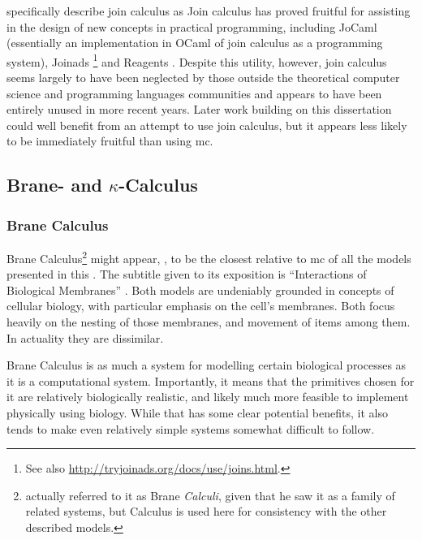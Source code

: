 \citeauthor{Fournet2002} specifically describe join calculus as   Join calculus has proved fruitful for assisting in the design of new concepts in practical programming, including JoCaml \cite{Fournet2003} (essentially an implementation in OCaml of join calculus as a programming system), Joinads \cite{Petricek2011}\footnote{See also \url{http://tryjoinads.org/docs/use/joins.html}.} and Reagents \cite{Turon2012}.  Despite this utility, however, join calculus seems largely to have been neglected by those outside the theoretical computer science and programming languages communities and appears to have been entirely unused in more recent years.  Later work building on this dissertation could well benefit from an attempt to use join calculus, but it appears less likely to be immediately fruitful than using \gls{mc}.

\subsection[Brane and Kappa-Calculus]{Brane- and \(\kappa\)-Calculus}
\subsubsection{Brane Calculus}
Brane Calculus\footnote{\citeauthor{Cardelli2005} actually referred to it as Brane \emph{Calculi}, given that he saw it as a family of related systems, but Calculus is used here for consistency with the other described models.} might appear, , to be the closest relative to \gls{mc} of all the models presented in this .  The subtitle given to its exposition is \enquote{Interactions of Biological Membranes} \cite{Cardelli2005}.  Both models are undeniably grounded in concepts of cellular biology, with particular emphasis on the cell's membranes.  Both focus heavily on the nesting of those membranes, and movement of items among them.  In actuality they are dissimilar.

Brane Calculus is as much a system for modelling certain biological processes as it is a computational system.  Importantly, it means that the primitives chosen for it are relatively biologically realistic, and likely much more feasible to implement physically using biology.  While that has some clear potential benefits, it also tends to make even relatively simple systems somewhat difficult to follow.

